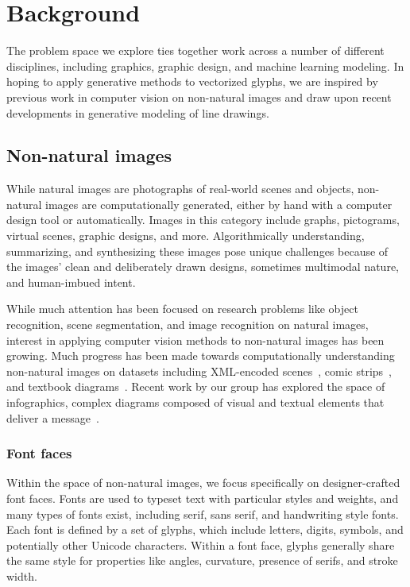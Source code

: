\chapter{Background}
The problem space we explore ties together work across a number of different disciplines, including graphics, graphic design, and machine learning modeling.
In hoping to apply generative methods to vectorized glyphs, we are inspired by previous work in computer vision on non-natural images and draw upon recent developments in generative modeling of line drawings.

\section{Non-natural images}
While natural images are photographs of real-world scenes and objects, non-natural images are computationally generated, either by hand with a computer design tool or automatically.
Images in this category include graphs, pictograms, virtual scenes, graphic designs, and more.
Algorithmically understanding, summarizing, and synthesizing these images pose unique challenges because of the images' clean and deliberately drawn designs, sometimes multimodal nature, and human-imbued intent. 

While much attention has been focused on research problems like object recognition, scene segmentation, and image recognition on natural images, interest in applying computer vision methods to non-natural images has been growing.
Much progress has been made towards computationally understanding non-natural images on datasets including XML-encoded scenes~\cite{wu2017neural}, comic strips~\cite{iyyer2016amazing}, and textbook diagrams~\cite{seo2014diagram}.
Recent work by our group has explored the space of infographics, complex diagrams composed of visual and textual elements that deliver a message~\cite{bylinskii2017understanding}.

\subsection{Font faces}
Within the space of non-natural images, we focus specifically on designer-crafted font faces.
Fonts are used to typeset text with particular styles and weights, and many types of fonts exist, including serif, sans serif, and handwriting style fonts.
Each font is defined by a set of glyphs, which include letters, digits, symbols, and potentially other Unicode characters.
Within a font face, glyphs generally share the same style for properties like angles, curvature, presence of serifs, and stroke width.

